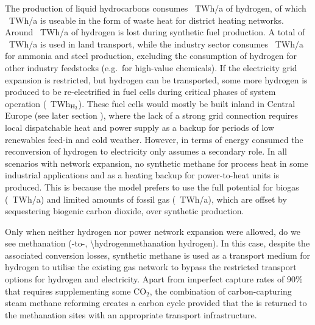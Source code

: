 The production of liquid hydrocarbons consumes \ptlhydrogenusage~TWh/a of
hydrogen, of which \ptlwasteheat~TWh/a is useable in the form of waste heat for
district heating networks. Around \hydrogenlosses~TWh/a of hydrogen is lost
during synthetic fuel production. A total of \hydrogentransportdemand~TWh/a is
used in land transport, while the industry sector consumes
\hydrogenindustrydemand~TWh/a for ammonia and steel production, excluding the
consumption of hydrogen for other industry feedstocks (e.g.~for high-value
chemicals).  If the electricity grid expansion is restricted, but hydrogen can
be transported, some more hydrogen is produced to be re-electrified in fuel
cells during critical phases of system operation
(\hydrogenfuelcell~TWh$_{\ce{H2}}$). These fuel cells would mostly be built
inland in Central Europe (see later section ), where the lack of
a strong grid connection requires local dispatchable heat and power supply as a
backup for periods of low renewables feed-in and cold weather. However, in terms
of energy consumed the reconversion of hydrogen to electricity only assumes a
secondary role. In all scenarios with network expansion, no synthetic methane
for process heat in some industrial applications and as a heating backup for
power-to-heat units is produced. This is because the model prefers to use the
full potential for biogas (\biogas~TWh/a) and limited amounts of fossil gas
(\fossilgas~TWh/a), which are offset by sequestering biogenic carbon dioxide,
over synthetic production.

Only when neither hydrogen nor power network expansion were allowed, do we see
methanation (-to-, \SI{\hydrogenmethanation}{\twh} hydrogen). In
this case, despite the associated conversion losses, synthetic methane is used
as a transport medium for hydrogen to utilise the existing gas network to bypass
the restricted transport options for hydrogen and electricity. Apart from
imperfect capture rates of 90\% that requires supplementing some CO$_2$, the
combination of carbon-capturing steam methane reforming creates a carbon cycle
provided that the \co is returned to the methanation sites with an appropriate
\co transport infrastructure.

